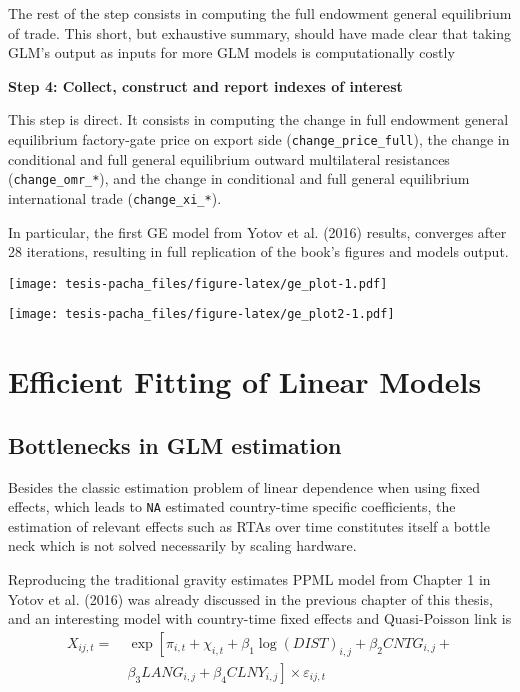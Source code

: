 \documentclass[12pt,reqno,oneside,pdftex]{formato-puc/puctesis} %
\begin{document}
The rest of the step consists in computing the full endowment general
equilibrium of trade. This short, but exhaustive summary, should have
made clear that taking GLM's output as inputs for more GLM models is
computationally costly

\textbf{Step 4: Collect, construct and report indexes of interest}

This step is direct. It consists in computing the change in full
endowment general equilibrium factory-gate price on export side
(\texttt{change\_price\_full}), the change in conditional and full
general equilibrium outward multilateral resistances
(\texttt{change\_omr\_*}), and the change in conditional and full
general equilibrium international trade (\texttt{change\_xi\_*}).

In particular, the first GE model from Yotov et al. (2016) results,
converges after 28 iterations, resulting in full replication of the
book's figures and models output.

\texttt{[image: tesis-pacha\_files/figure-latex/ge\_plot-1.pdf]}

\texttt{[image: tesis-pacha\_files/figure-latex/ge\_plot2-1.pdf]}

\chapter{Efficient Fitting of Linear Models}

\hypertarget{bottlenecks-in-glm-estimation}{%
\section{Bottlenecks in GLM
estimation}\label{bottlenecks-in-glm-estimation}}

Besides the classic estimation problem of linear dependence when using
fixed effects, which leads to \texttt{NA} estimated country-time
specific coefficients, the estimation of relevant effects such as RTAs
over time constitutes itself a bottle neck which is not solved
necessarily by scaling hardware.

Reproducing the traditional gravity estimates PPML model from Chapter 1
in Yotov et al. (2016) was already discussed in the previous chapter of
this thesis, and an interesting model with country-time fixed effects
and Quasi-Poisson link is \begin{align*}
X_{ij,t} =& \:\exp\left[\pi_{i,t} + \chi_{i,t} + \beta_1 \log(DIST)_{i,j} + \beta_2 CNTG_{i,j} +\right.\\
\text{ }& \:\left.\beta_3 LANG_{i,j} + \beta_4 CLNY_{i,j}\right] \times \varepsilon_{ij,t}
\end{align*}
\end{document}
